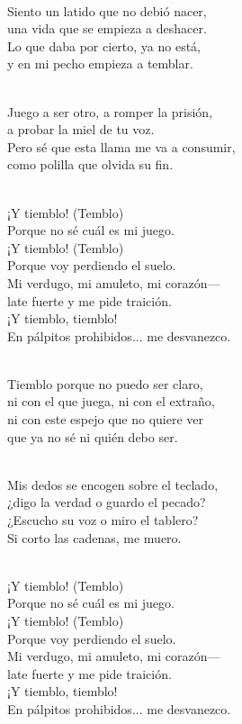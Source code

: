 \begin{lyrics}
 \\
Siento un latido que no debió nacer,\\
una vida que se empieza a deshacer.\\
Lo que daba por cierto, ya no está,\\
y en mi pecho empieza a temblar.

 \\
Juego a ser otro, a romper la prisión,\\
a probar la miel de tu voz.\\
Pero sé que esta llama me va a consumir,\\
como polilla que olvida su fin.

 \\
¡Y tiemblo! (Temblo)\\
Porque no sé cuál es mi juego.\\
¡Y tiemblo! (Temblo)\\
Porque voy perdiendo el suelo.\\
Mi verdugo, mi amuleto, mi corazón—\\
late fuerte y me pide traición.\\
¡Y tiemblo, tiemblo!\\
En pálpitos prohibidos... me desvanezco.

 \\
Tiemblo porque no puedo ser claro,\\
ni con el que juega, ni con el extraño,\\
ni con este espejo que no quiere ver\\
que ya no sé ni quién debo ser.

 \\
Mis dedos se encogen sobre el teclado,\\
¿digo la verdad o guardo el pecado?\\
¿Escucho su voz o miro el tablero?\\
Si corto las cadenas, me muero.

 \\
¡Y tiemblo! (Temblo)\\
Porque no sé cuál es mi juego.\\
¡Y tiemblo! (Temblo)\\
Porque voy perdiendo el suelo.\\
Mi verdugo, mi amuleto, mi corazón—\\
late fuerte y me pide traición.\\
¡Y tiemblo, tiemblo!\\
En pálpitos prohibidos... me desvanezco.


\end{lyrics}
